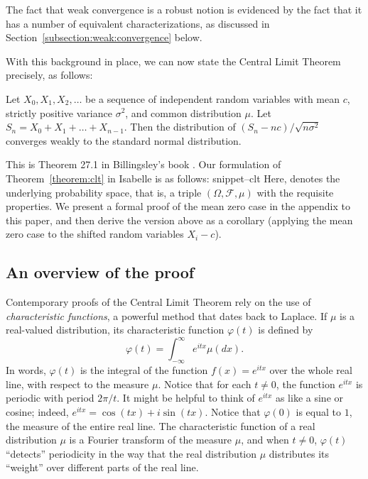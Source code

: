 \documentclass{svjour3}
\newcommand{\ph}{\varphi}
\newcommand{\Snippet}[1]{\csname snippet--#1\endcsname}
\begin{document}
The fact that weak convergence is a robust notion is evidenced by the fact that it has a number of equivalent characterizations, as discussed in Section~\ref{subsection:weak:convergence} below.

With this background in place, we can now state the Central Limit Theorem precisely, as follows:
\begin{theorem}
\label{theorem:clt}
Let $X_0, X_1, X_2, \ldots$ be a sequence of independent random variables with mean $c$, strictly positive variance $\sigma^2$, and common distribution $\mu$. Let $S_n = X_0 + X_1 + \ldots + X_{n-1}$. Then the distribution of $(S_n - n c) / \sqrt{n \sigma^2}$ converges weakly to the standard normal distribution.
\end{theorem}
This is Theorem 27.1 in Billingsley's book \cite{billingsley:95}. Our formulation of Theorem~\ref{theorem:clt} in Isabelle is as follows:
\Snippet{clt}
Here,  denotes the underlying probability space, that is, a triple $(\Omega,\mathcal F,\mu)$ with the requisite properties. We present a formal proof of the mean zero case in the appendix to this paper, and then derive the version above as a corollary (applying the mean zero case to the shifted random variables $X_i - c$).

\subsection{An overview of the proof}
\label{subsection:overview}

Contemporary proofs of the Central Limit Theorem rely on the use of \emph{characteristic functions}, a powerful method that dates back to Laplace. If $\mu$ is a real-valued distribution, its characteristic function $\ph(t)$ is defined by
\[
\ph(t) = \int_{-\infty}^{\infty} e^{itx} \mu(dx).
\]
In words, $\ph(t)$ is the integral of the function $f(x) = e^{itx}$ over the whole real line, with respect to the measure $\mu$. Notice that for each $t \neq 0$, the function $e^{itx}$ is periodic with period $2 \pi / t$. It might be helpful to think of $e^{itx}$ as like a sine or cosine; indeed, $e^{itx}= \cos (t x) + i \sin (t x)$. Notice that $\ph(0)$ is equal to $1$, the measure of the entire real line. The characteristic function of a real distribution $\mu$ is a Fourier transform of the measure $\mu$, and when $t \neq 0$, $\ph(t)$ ``detects'' periodicity in the way that the real distribution $\mu$ distributes its ``weight'' over different parts of the real line.
\end{document}
